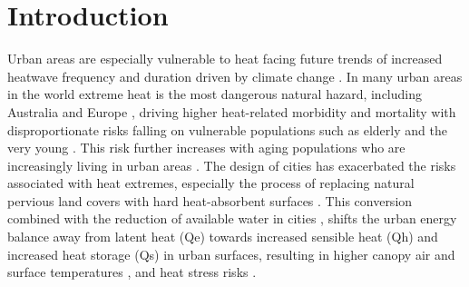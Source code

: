 \documentclass[final,3p,times,authoryear]{elsarticle}
\begin{document}
\maketitle

\section{Introduction}\label{sec:introduction}

Urban areas are especially vulnerable to heat facing future trends of increased heatwave frequency and duration \citep{Cowan2014,Perkins-Kirkpatrick2020} driven by climate change \citep{IPCC2022}. In many urban areas in the world extreme heat is the most dangerous natural hazard, including Australia \citep{Coates2014} and Europe \citep{Forzieri2017}, driving higher heat-related morbidity and mortality \citep{Heidari2020} with disproportionate risks falling on vulnerable populations such as elderly and the very young \citep{Nicholls2008,Wilson2011a}. This risk further increases with aging populations who are increasingly living in urban areas \citep{ABS2008}. The design of cities has exacerbated the risks associated with heat extremes, especially the process of replacing natural pervious land covers with hard heat-absorbent surfaces \citep{Brunner2013}. This conversion combined with the reduction of available water in cities \citep{Spronken-Smith2010,Coutts2012,Middel2019a,Cheung2022b}, shifts the urban energy balance \citep{Oke1982,Oke1989} away from latent heat (\gls{Qe}) towards increased sensible heat (\gls{Qh}) and increased heat storage (\gls{Qs}) in urban surfaces, resulting in higher canopy air and surface temperatures \citep{Coutts2012,Martilli2020,Nice2022a}, and heat stress risks \citep{Nicholls2008,Loughnan2010,Nazarian2022}.
\end{document}
